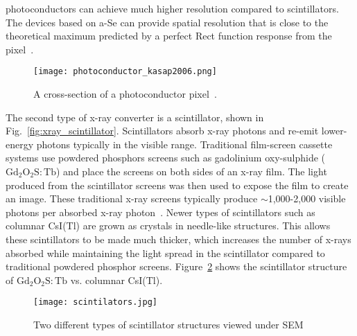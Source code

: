 photoconductors can achieve much higher resolution compared to scintillators.  The devices based on a-Se can provide spatial resolution that is close to the theoretical maximum predicted by a perfect Rect function response from the pixel~\citep{hunt5030}. 

\begin{figure}[ht]
\centering
\texttt{[image: photoconductor\_kasap2006.png]}
\caption{A cross-section of a photoconductor pixel~\citep{kasap2006}.}
\label{fig:photoconductor_cross_section}
\end{figure}

The second type of x-ray converter is a scintillator, shown in Fig.~\ref{fig:xray_scintillator}.  Scintillators absorb x-ray photons and re-emit lower-energy photons typically in the visible range.  Traditional film-screen cassette systems use powdered phosphors screens such as gadolinium oxy-sulphide ($\mathrm{Gd_2O_2S \colon Tb}$) and place the screens on both sides of an x-ray film.  The light produced from the scintillator screens was then used to expose the film to create an image.  These traditional x-ray screens typically produce $\sim$1,000-2,000 visible photons per absorbed x-ray photon~\citep{trauernicht1988, trauernicht1990}. Newer types of scintillators such as columnar CsI(Tl) are grown as crystals in needle-like structures.  This allows these scintillators to be made much thicker, which increases the number of x-rays absorbed while maintaining the light spread in the scintillator compared to traditional powdered phosphor screens.  Figure~\ref{fig:scintillators} shows the scintillator structure of $\mathrm{Gd_2O_2S:Tb}$ vs. columnar CsI(Tl).

\begin{figure}[ht]
\texttt{[image: scintilators.jpg]}
\caption{Two different types of scintillator structures viewed under SEM~\citep{scintillatorImage}}
\label{fig:scintillators}
\end{figure}


